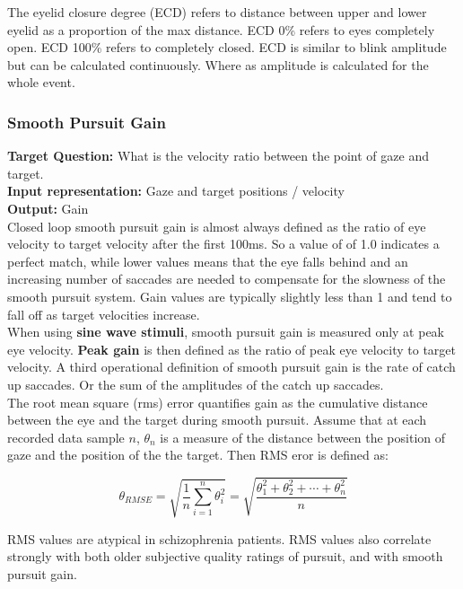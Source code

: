 \documentclass[12pt]{article}
\theoremstyle{definition}
\begin{document}
The eyelid closure degree (ECD) refers to distance between upper and lower eyelid as a proportion of the max distance. ECD 0\% refers to eyes completely open. ECD 100\% refers to completely closed. ECD is similar to blink amplitude but can be calculated continuously. Where as amplitude is calculated for the whole event. 

\subsubsection{Smooth Pursuit Gain}
\textbf{Target Question:} What is the velocity ratio between the point of gaze and target.\\
\textbf{Input representation:} Gaze and target positions / velocity\\
\textbf{Output:} Gain \\

Closed loop smooth pursuit gain is almost always defined as the ratio of eye velocity to target velocity after the first 100ms. So a value of of 1.0 indicates a perfect match, while lower values means that the eye falls behind and an increasing number of saccades are needed to compensate for the slowness of the smooth pursuit system. Gain values are typically slightly less than 1 and tend to fall off as target velocities increase.\\

When using \textbf{sine wave stimuli}, smooth pursuit gain is measured only at peak eye velocity. \textbf{Peak gain} is then defined as the ratio of peak eye velocity to target velocity. A third operational definition of smooth pursuit gain is the rate of catch up saccades. Or the sum of the amplitudes of the catch up saccades.\\

The root mean square (rms) error quantifies gain as the cumulative distance between the eye and the target during smooth pursuit. Assume that at each recorded data sample $n$, $\theta_n$ is a  measure of the distance between the position of gaze and the position of the the target. Then RMS eror is defined as:

\[\theta_{RMSE} = \sqrt{\frac{1}{n}\sum_{i=1}^{n}\theta_i^2}  = 
 \sqrt{\frac{\theta_1^2 + \theta_2^2 + \cdots + \theta_n^2}{n}} \]

RMS values are atypical in schizophrenia patients. RMS values also correlate strongly with both older subjective quality ratings of pursuit, and with smooth pursuit gain.\\ 
\end{document}
